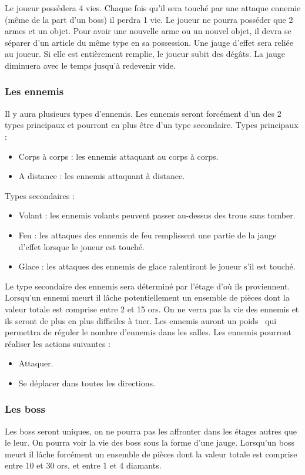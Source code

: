 \documentclass[]{extarticle}
\begin{document}
Le joueur possèdera 4 vies. Chaque fois qu’il sera touché par une attaque ennemie (même de la part d’un boss) il perdra 1 vie.
\bigbreak
Le joueur ne pourra posséder que 2 armes et un objet. Pour avoir une nouvelle arme ou un nouvel objet, il devra se séparer d’un article du même type en sa possession.
 \bigbreak
Une jauge d’effet sera reliée au joueur. Si elle est entièrement remplie, le joueur subit des dégâts. La jauge diminuera avec le temps jusqu’à redevenir vide.
\bigbreak

		\subsubsection{Les ennemis}
\bigbreak
\bigbreak
Il y aura plusieurs types d’ennemis. Les ennemis seront forcément d’un des 2 types principaux et pourront en plus être d’un type secondaire.
\bigbreak
Types principaux :
\begin{itemize}
\item Corps à corps : les ennemis attaquant au corps à corps.
\item A distance : les ennemis attaquant à distance.
\end{itemize}
\bigbreak
Types secondaires :
\begin{itemize}
\item Volant : les ennemis volants peuvent passer au-dessus des trous sans tomber.
\item Feu : les attaques des ennemis de feu remplissent une partie de la jauge d’effet lorsque le joueur est touché.
\item Glace : les attaques des ennemis de glace ralentiront le joueur s’il est touché.
\end{itemize}
\bigbreak 
Le type secondaire des ennemis sera déterminé par l’étage d’où ils proviennent.
\bigbreak
Lorsqu’un ennemi meurt il lâche potentiellement un ensemble de pièces dont la valeur totale est comprise entre 2 et 15 ors.
\bigbreak
On ne verra pas la vie des ennemis et ils seront de plus en plus difficiles à tuer. 
\bigbreak
Les ennemis auront un \og poids \fg \, qui permettra de réguler le nombre d’ennemis dans les salles.
\bigbreak
Les ennemis pourront réaliser les actions suivantes :
\begin{itemize}
\item Attaquer.
\item Se déplacer dans toutes les directions.
\end{itemize}
\bigbreak

		\subsubsection{Les boss}
\bigbreak
\bigbreak
Les boss seront uniques, on ne pourra pas les affronter dans les étages autres que le leur.
On pourra voir la vie des boss sous la forme d’une jauge. Lorsqu’un boss meurt il lâche forcément un ensemble de pièces dont la valeur totale est comprise entre 10 et 30 ors, et entre 1 et 4 diamants.
\bigbreak
\newpage
\end{document}
